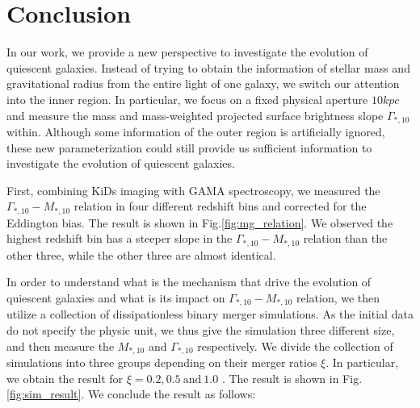 \documentclass[fleqn,usenatbib]{mnras}
\begin{document}
\section{Conclusion}
\label{sec:5}
In our work, we provide a new perspective to investigate the evolution of quiescent galaxies. Instead of trying to obtain the information of stellar mass and gravitational radius from the entire light of one galaxy, we switch our attention into the inner region. In particular, we focus on a fixed physical aperture $10kpc$ and measure the mass and mass-weighted projected surface brightness slope $\Gamma_{*,10}$ within. Although some information of the outer region is artificially ignored, these new parameterization could still provide us sufficient information to investigate the evolution of quiescent galaxies.
\par First, combining KiDs imaging with GAMA spectroscopy, we measured the $\Gamma_{*,10} - M_{*,10}$ relation in four different redshift bins and corrected for the Eddington bias. The result is shown in Fig.\ref{fig:mg_relation}. We observed the highest redshift bin has a steeper slope in the $\Gamma_{*,10} - M_{*,10}$ relation than the other three, while the other three are almost identical.
\par In order to understand what is the mechanism that drive the evolution of quiescent galaxies and what is its impact on $\Gamma_{*,10} - M_{*,10}$  relation, we then utilize a collection of dissipationless binary merger simulations. As the initial data do not specify the physic unit, we thus give the simulation three different size, and then measure the $M_{*,10}$ and $\Gamma_{*,10}$ respectively. 
We divide the collection of simulations into three groups depending on their merger ratios $\xi$. In particular, we obtain the result for $\xi =  0.2, 0.5 ~\text{and}~ 1.0 $ . The result is shown in Fig.\ref{fig:sim_result}. We conclude the result as follows:
\end{document}
